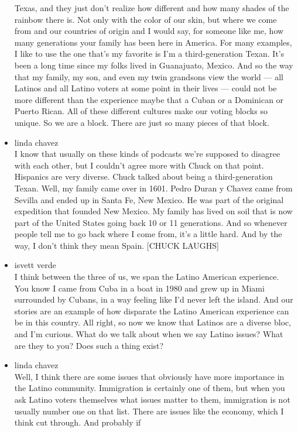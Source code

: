 \begin{itemize}
  Texas, and they just don't realize how different and how many shades
  of the rainbow there is. Not only with the color of our skin, but
  where we come from and our countries of origin and I would say, for
  someone like me, how many generations your family has been here in
  America. For many examples, I like to use the one that's my favorite
  is I'm a third-generation Texan. It's been a long time since my folks
  lived in Guanajuato, Mexico. And so the way that my family, my son,
  and even my twin grandsons view the world --- all Latinos and all
  Latino voters at some point in their lives --- could not be more
  different than the experience maybe that a Cuban or a Dominican or
  Puerto Rican. All of these different cultures make our voting blocks
  so unique. So we are a block. There are just so many pieces of that
  block.
\item
  linda chavez\\
  I know that usually on these kinds of podcasts we're supposed to
  disagree with each other, but I couldn't agree more with Chuck on that
  point. Hispanics are very diverse. Chuck talked about being a
  third-generation Texan. Well, my family came over in 1601. Pedro Duran
  y Chavez came from Sevilla and ended up in Santa Fe, New Mexico. He
  was part of the original expedition that founded New Mexico. My family
  has lived on soil that is now part of the United States going back 10
  or 11 generations. And so whenever people tell me to go back where I
  come from, it's a little hard. And by the way, I don't think they mean
  Spain. {[}CHUCK LAUGHS{]}
\item
  isvett verde\\
  I think between the three of us, we span the Latino American
  experience. You know I came from Cuba in a boat in 1980 and grew up in
  Miami surrounded by Cubans, in a way feeling like I'd never left the
  island. And our stories are an example of how disparate the Latino
  American experience can be in this country. All right, so now we know
  that Latinos are a diverse bloc, and I'm curious. What do we talk
  about when we say Latino issues? What are they to you? Does such a
  thing exist?
\item
  linda chavez\\
  Well, I think there are some issues that obviously have more
  importance in the Latino community. Immigration is certainly one of
  them, but when you ask Latino voters themselves what issues matter to
  them, immigration is not usually number one on that list. There are
  issues like the economy, which I think cut through. And probably if

\end{itemize}
